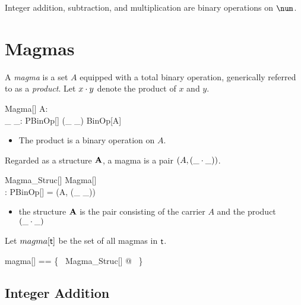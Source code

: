 \documentclass{amsart}
\begin{document}
\begin{example} Integer addition, subtraction, and multiplication are binary operations on $\num$.


\end{example}

\section{Magmas}

A \textit{magma} is a set $A$ equipped with a total binary operation, 
generically referred to as a \textit{product}.
Let $x \mathbin{\cdot} y$ denote the product of $x$ and $y$.

\begin{schema}{Magma}[\genT]
	A: \power \genT \\
	\_ \opG \_: PBinOp[\genT]
\where
	(\_ \opG \_) \in BinOp[A]
\end{schema}

\begin{itemize}
	\item The product is a binary operation on $A$.
\end{itemize}

Regarded as a structure $\mathbf{A}$, a magma is a pair $(A, (\_ \mathbin{\cdot} \_))$.

\begin{schema}{Magma\_Struc}[\genT]
	Magma[\genT] \\
	\strucA: \power \genT \cross PBinOp[\genT]
\where
	\strucA = (A, (\_ \opG \_))
\end{schema}

\begin{itemize}
	\item the structure $\mathbf{A}$ is the pair consisting of the carrier $A$ and the product $(\_ \mathbin{\cdot} \_)$
\end{itemize}


Let $magma[\mathsf{t}]$ be the set of all magmas in $\mathsf{t}$.
\begin{zed}
	magma[\genT] == \{~ Magma\_Struc[\genT] @ \strucA ~\}
\end{zed}

\subsection{Integer Addition}
\end{document}
